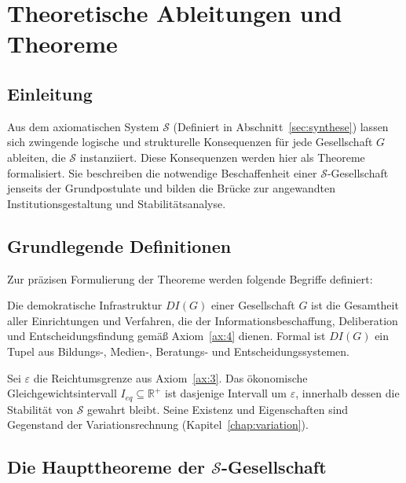
\chapter{Theoretische Ableitungen und Theoreme}
\label{chap:theoreme}

\section{Einleitung}
Aus dem axiomatischen System $\mathcal{S}$ (Definiert in Abschnitt~\ref{sec:synthese}) lassen sich zwingende logische und strukturelle Konsequenzen für jede Gesellschaft $G$ ableiten, die $\mathcal{S}$ instanziiert. Diese Konsequenzen werden hier als Theoreme formalisiert. Sie beschreiben die notwendige Beschaffenheit einer $\mathcal{S}$-Gesellschaft jenseits der Grundpostulate und bilden die Brücke zur angewandten Institutionsgestaltung und Stabilitätsanalyse.

\section{Grundlegende Definitionen}
Zur präzisen Formulierung der Theoreme werden folgende Begriffe definiert:

\begin{definition}
    Die demokratische Infrastruktur $\mathit{DI}(G)$ einer Gesellschaft $G$ ist die Gesamtheit aller Einrichtungen und Verfahren, die der Informationsbeschaffung, Deliberation und Entscheidungsfindung gemäß Axiom~\ref{ax:4} dienen. Formal ist $\mathit{DI}(G)$ ein Tupel aus Bildungs-, Medien-, Beratungs- und Entscheidungssystemen.
\end{definition}

\begin{definition}
    Sei $\varepsilon$ die Reichtumsgrenze aus Axiom~\ref{ax:3}. Das ökonomische Gleichgewichtsintervall $I_{\mathit{eq}} \subseteq \mathbb{R}^+$ ist dasjenige Intervall um $\varepsilon$, innerhalb dessen die Stabilität von $\mathcal{S}$ gewahrt bleibt. Seine Existenz und Eigenschaften sind Gegenstand der Variationsrechnung (Kapitel~\ref{chap:variation}).
\end{definition}

\section{Die Haupttheoreme der $\mathcal{S}$-Gesellschaft}

